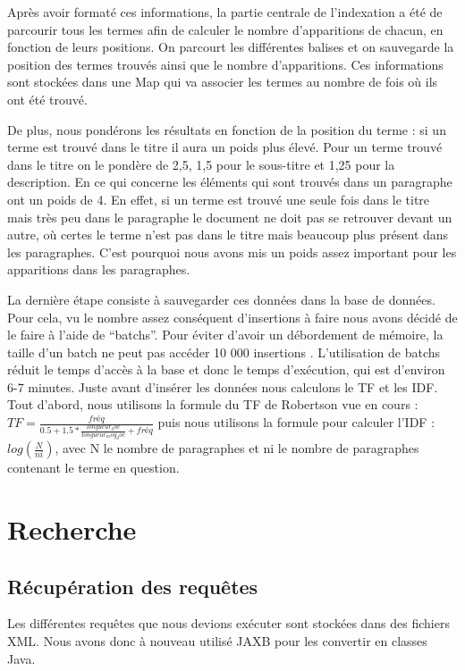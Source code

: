 \documentclass{article}
\begin{document}
Après avoir formaté ces informations, la partie centrale de l’indexation a été de
parcourir tous les termes afin de calculer le nombre d’apparitions de chacun, en
fonction de leurs positions. On parcourt les différentes balises et on sauvegarde la
position des termes trouvés ainsi que le nombre d’apparitions. Ces informations sont
stockées dans une Map qui va associer les termes au nombre de fois où ils ont été
trouvé.


De plus, nous pondérons les résultats en fonction de la position du terme : si un
terme est trouvé dans le titre il aura un poids plus élevé. Pour un terme trouvé dans
le titre on le pondère de 2,5, 1,5 pour le sous-titre et 1,25 pour la description. En
ce qui concerne les éléments qui sont trouvés dans un paragraphe ont un poids de 4.
En effet, si un terme est trouvé une seule fois dans le titre mais très peu dans le
paragraphe le document ne doit pas se retrouver devant un autre, où certes le terme
n’est pas dans le titre mais beaucoup plus présent dans les paragraphes. C’est
pourquoi nous avons mis un poids assez important pour les apparitions dans les
paragraphes. 

La dernière étape consiste à sauvegarder ces données dans la base de données. Pour
cela, vu le nombre assez conséquent d’insertions à faire nous avons décidé de le
faire à l’aide de “batchs”. Pour éviter d’avoir un débordement de mémoire, la taille
d’un batch ne peut pas accéder 10 000 insertions . L’utilisation de batchs réduit le
temps d’accès à la base et donc le temps d’exécution, qui est d’environ 6-7 minutes.
Juste avant d’insérer les données nous calculons le TF et les IDF. Tout d’abord, nous
utilisons la formule du TF de Robertson vue en cours
: $ TF= \frac{fréq} {0.5 + 1.5 * \frac{longueur_doc}{longueur_moy_doc} + fréq}$
puis nous utilisons la formule pour calculer l’IDF : $log(\frac{N}{ni})$, avec N le
nombre de paragraphes et ni le nombre de paragraphes contenant le terme en question.


\section{Recherche}

\subsection{Récupération des requêtes}

Les différentes requêtes que nous devions exécuter sont stockées dans des fichiers
XML. Nous avons donc à nouveau utilisé JAXB pour les convertir en classes Java. 
\end{document}
